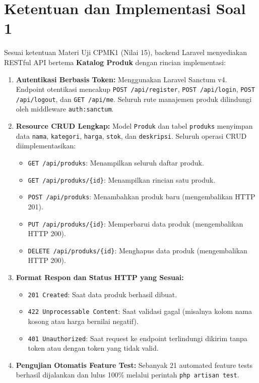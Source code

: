 \documentclass[a4paper,oneside,11pt]{book}
\begin{document}
\section{Ketentuan dan Implementasi Soal 1}
Sesuai ketentuan Materi Uji CPMK1 (Nilai 15), backend Laravel menyediakan RESTful API bertema \textbf{Katalog Produk} dengan rincian implementasi:
\begin{enumerate}
    \item \textbf{Autentikasi Berbasis Token:} Menggunakan Laravel Sanctum v4. Endpoint otentikasi mencakup \texttt{POST /api/register}, \texttt{POST /api/login}, \texttt{POST /api/logout}, dan \texttt{GET /api/me}. Seluruh rute manajemen produk dilindungi oleh middleware \texttt{auth:sanctum}.
    \item \textbf{Resource CRUD Lengkap:} Model \texttt{Produk} dan tabel \texttt{produks} menyimpan data \texttt{nama}, \texttt{kategori}, \texttt{harga}, \texttt{stok}, dan \texttt{deskripsi}. Seluruh operasi CRUD diimplementasikan:
    \begin{itemize}
        \item \texttt{GET /api/produks}: Menampilkan seluruh daftar produk.
        \item \texttt{GET /api/produks/\{id\}}: Menampilkan rincian satu produk.
        \item \texttt{POST /api/produks}: Menambahkan produk baru (mengembalikan HTTP 201).
        \item \texttt{PUT /api/produks/\{id\}}: Memperbarui data produk (mengembalikan HTTP 200).
        \item \texttt{DELETE /api/produks/\{id\}}: Menghapus data produk (mengembalikan HTTP 200).
    \end{itemize}
    \item \textbf{Format Respon dan Status HTTP yang Sesuai:}
    \begin{itemize}
        \item \texttt{201 Created}: Saat data produk berhasil dibuat.
        \item \texttt{422 Unprocessable Content}: Saat validasi gagal (misalnya kolom nama kosong atau harga bernilai negatif).
        \item \texttt{401 Unauthorized}: Saat request ke endpoint terlindungi dikirim tanpa token atau dengan token yang tidak valid.
    \end{itemize}
    \item \textbf{Pengujian Otomatis Feature Test:} Sebanyak 21 automated feature tests berhasil dijalankan dan lulus 100\% melalui perintah \texttt{php artisan test}.
\end{enumerate}
\end{document}
